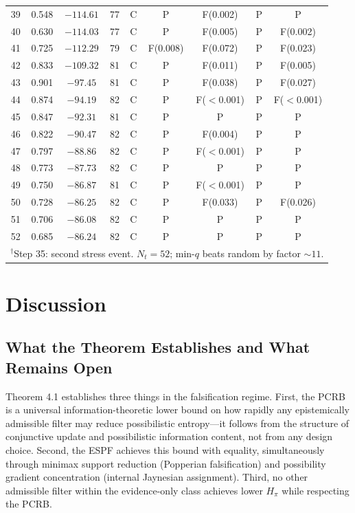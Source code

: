 \documentclass[12pt]{article}
\begin{document}
\begin{table}[ht]
\begin{tabular}{ccccccccc}
39 & 0.548 & $-114.61$ & 77 & C & P & F(0.002) & P & P \\
40 & 0.630 & $-114.03$ & 77 & C & P & F(0.005) & P & F(0.002) \\
41 & 0.725 & $-112.29$ & 79 & C & F(0.008) & F(0.072) & P & F(0.023) \\
42 & 0.833 & $-109.32$ & 81 & C & P & F(0.011) & P & F(0.005) \\
43 & 0.901 & $-97.45$  & 81 & C & P & F(0.038) & P & F(0.027) \\
44 & 0.874 & $-94.19$  & 82 & C & P & F($<$0.001) & P & F($<$0.001) \\
45 & 0.847 & $-92.31$  & 81 & C & P & P & P & P \\
46 & 0.822 & $-90.47$  & 82 & C & P & F(0.004) & P & P \\
47 & 0.797 & $-88.86$  & 82 & C & P & F($<$0.001) & P & P \\
48 & 0.773 & $-87.73$  & 82 & C & P & P & P & P \\
49 & 0.750 & $-86.87$  & 81 & C & P & F($<$0.001) & P & P \\
50 & 0.728 & $-86.25$  & 82 & C & P & F(0.033) & P & F(0.026) \\
51 & 0.706 & $-86.08$  & 82 & C & P & P & P & P \\
52 & 0.685 & $-86.24$  & 82 & C & P & P & P & P \\
\bottomrule
\multicolumn{9}{l}{$^\dagger$Step 35: second stress event. $N_t = 52$; min-$q$ beats random by factor $\sim 11$.}
\end{tabular}
\end{table}

\section{Discussion}
\label{sec:discussion}

\subsection{What the Theorem Establishes and What Remains Open}

Theorem 4.1 establishes three things in the falsification regime. First, the PCRB is a universal information-theoretic lower bound on how rapidly any epistemically admissible filter may reduce possibilistic entropy---it follows from the structure of conjunctive update and possibilistic information content, not from any design choice. Second, the ESPF achieves this bound with equality, simultaneously through minimax support reduction (Popperian falsification) and possibility gradient concentration (internal Jaynesian assignment). Third, no other admissible filter within the evidence-only class achieves lower $H_\pi$ while respecting the PCRB.
\end{document}
